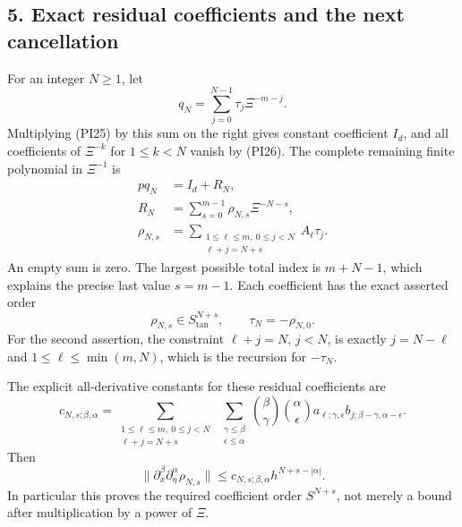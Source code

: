 \documentclass[
  11pt,
]{article}
\makeatletter
\let\ReaderOriginalAnchorStart\hyper@anchorstart
\let\ReaderOriginalAnchorEnd\hyper@anchorend
\let\ReaderPendingAliases\@empty
\def\ReaderArmAliases#1{\gdef\ReaderPendingAliases{#1}}
\def\hyper@anchorstart#1{\ReaderIfNativeAnchorTF{#1}{\ReaderPendingAliases\global\let\ReaderPendingAliases\@empty}{}\ReaderOriginalAnchorStart{#1}}
\makeatother
\begin{document}
\ReaderArmAliases{\ReaderOriginalAnchorStart{AN03-PIN-005}\ReaderOriginalAnchorEnd\begingroup\expandafter\def\csname @currentHref\endcsname{AN03-PIN-005}\label{AN03-PIN-005}\endgroup\ReaderOriginalAnchorStart{an03-pin-005-exact-residual-coefficients-and-the-next-cancellation}\ReaderOriginalAnchorEnd\begingroup\expandafter\def\csname @currentHref\endcsname{an03-pin-005-exact-residual-coefficients-and-the-next-cancellation}\label{an03-pin-005-exact-residual-coefficients-and-the-next-cancellation}\endgroup\ReaderOriginalAnchorStart{5-exact-residual-coefficients-and-the-next-cancellation}\ReaderOriginalAnchorEnd\begingroup\expandafter\def\csname @currentHref\endcsname{5-exact-residual-coefficients-and-the-next-cancellation}\label{5-exact-residual-coefficients-and-the-next-cancellation}\endgroup}
\subsection{5. Exact residual coefficients and the next
cancellation}\label{exact-residual-coefficients-and-the-next-cancellation}

For an integer \(N\geq1\), let \[
 q_N=\sum_{j=0}^{N-1}\tau_j\Xi^{-m-j}.
 \tag{PI31}
\] Multiplying (PI25) by this sum on the right gives constant
coefficient \(I_d\), and all coefficients of \(\Xi^{-k}\) for
\(1\leq k<N\) vanish by (PI26). The complete remaining finite polynomial
in \(\Xi^{-1}\) is \[
 \begin{split}
 p q_N&=I_d+R_N,\\
 R_N&=\sum_{s=0}^{m-1}\rho_{N,s}\Xi^{-N-s},\\
 \rho_{N,s}
 &=\sum_{\substack{1\leq\ell\leq m,\ 0\leq j<N\\\ell+j=N+s}}
 A_\ell\tau_j.
 \end{split}
 \tag{PI32}
\] An empty sum is zero. The largest possible total index is \(m+N-1\),
which explains the precise last value \(s=m-1\). Each coefficient has
the exact asserted order \[
 \rho_{N,s}\in S^{N+s}_{\mathrm{tan}},\qquad
 \tau_N=-\rho_{N,0}.
 \tag{PI33}
\] For the second assertion, the constraint \(\ell+j=N\), \(j<N\), is
exactly \(j=N-\ell\) and \(1\leq\ell\leq\min(m,N)\), which is the
recursion for \(-\tau_N\).

The explicit all-derivative constants for these residual coefficients
are \[
 c_{N,s;\beta,\alpha}=
 \sum_{\substack{1\leq\ell\leq m,\ 0\leq j<N\\\ell+j=N+s}}
 \ \sum_{\substack{\gamma\leq\beta\\\epsilon\leq\alpha}}
 \binom\beta\gamma\binom\alpha\epsilon
 a_{\ell;\gamma,\epsilon}
 b_{j;\beta-\gamma,\alpha-\epsilon}.
 \tag{PI34}
\] Then \[
 \|\partial_x^\beta\partial_\eta^\alpha\rho_{N,s}\|
 \leq c_{N,s;\beta,\alpha}h^{N+s-|\alpha|}.
 \tag{PI35}
\] In particular this proves the required coefficient order \(S^{N+s}\),
not merely a bound after multiplication by a power of \(\Xi\).
\end{document}
